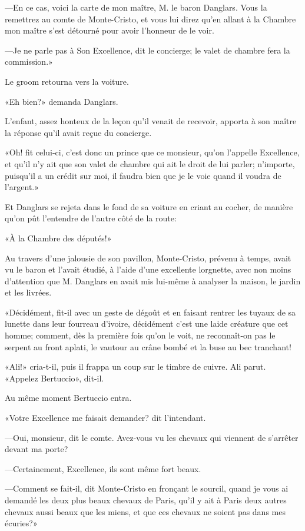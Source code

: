 —En ce cas, voici la carte de mon maître, M. le baron Danglars. Vous la remettrez au comte de Monte-Cristo, et vous lui direz qu'en allant à la Chambre mon maître s'est détourné pour avoir l'honneur de le voir. 

—Je ne parle pas à Son Excellence, dit le concierge; le valet de chambre fera la commission.» 

Le groom retourna vers la voiture. 

«Eh bien?» demanda Danglars. 

L'enfant, assez honteux de la leçon qu'il venait de recevoir, apporta à son maître la réponse qu'il avait reçue du concierge. 

«Oh! fit celui-ci, c'est donc un prince que ce monsieur, qu'on l'appelle Excellence, et qu'il n'y ait que son valet de chambre qui ait le droit de lui parler; n'importe, puisqu'il a un crédit sur moi, il faudra bien que je le voie quand il voudra de l'argent.» 

Et Danglars se rejeta dans le fond de sa voiture en criant au cocher, de manière qu'on pût l'entendre de l'autre côté de la route: 

«À la Chambre des députés!» 

Au travers d'une jalousie de son pavillon, Monte-Cristo, prévenu à temps, avait vu le baron et l'avait étudié, à l'aide d'une excellente lorgnette, avec non moins d'attention que M. Danglars en avait mis lui-même à analyser la maison, le jardin et les livrées. 

«Décidément, fit-il avec un geste de dégoût et en faisant rentrer les tuyaux de sa lunette dans leur fourreau d'ivoire, décidément c'est une laide créature que cet homme; comment, dès la première fois qu'on le voit, ne reconnaît-on pas le serpent au front aplati, le vautour au crâne bombé et la buse au bec tranchant! 

«Ali!» cria-t-il, puis il frappa un coup sur le timbre de cuivre. Ali parut. «Appelez Bertuccio», dit-il. 

Au même moment Bertuccio entra. 

«Votre Excellence me faisait demander? dit l'intendant.  

—Oui, monsieur, dit le comte. Avez-vous vu les chevaux qui viennent de s'arrêter devant ma porte? 

—Certainement, Excellence, ils sont même fort beaux. 

—Comment se fait-il, dit Monte-Cristo en fronçant le sourcil, quand je vous ai demandé les deux plus beaux chevaux de Paris, qu'il y ait à Paris deux autres chevaux aussi beaux que les miens, et que ces chevaux ne soient pas dans mes écuries?» 

